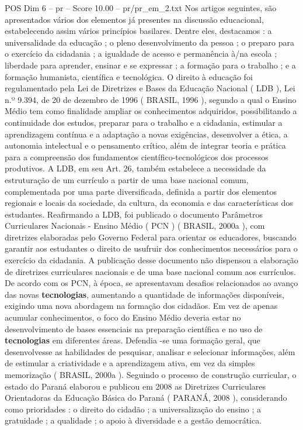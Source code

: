 \begin{textsample}{POS Dim 6 – pr – Score 10.00 – pr/pr\_em\_2.txt}
Nos artigos seguintes, são apresentados vários dos elementos já presentes na discussão educacional, estabelecendo assim vários princípios basilares.
Dentre eles, destacamos : a universalidade da educação ; o pleno desenvolvimento da pessoa ; o preparo para o exercício da cidadania ; a igualdade de acesso e permanência à/na escola ; liberdade para aprender, ensinar e se expressar ; a formação para o trabalho ; e a formação humanista, científica e tecnológica.
O direito à educação foi regulamentado pela Lei de Diretrizes e Bases da Educação Nacional ( LDB ), Lei n.º 9.394, de 20 de dezembro de 1996 ( BRASIL, 1996 ), segundo a qual o Ensino Médio tem como finalidade ampliar os conhecimentos adquiridos, possibilitando a continuidade dos estudos, preparar para o trabalho e a cidadania, estimular a aprendizagem contínua e a adaptação a novas exigências, desenvolver a ética, a autonomia intelectual e o pensamento crítico, além de integrar teoria e prática para a compreensão dos fundamentos científico-tecnológicos dos processos produtivos.
A LDB, em seu Art. 26, também estabelece a necessidade da estruturação de um currículo a partir de uma base nacional comum, complementada por uma parte diversificada, definida a partir dos elementos regionais e locais da sociedade, da cultura, da economia e das características dos estudantes.
Reafirmando a LDB, foi publicado o documento Parâmetros Curriculares Nacionais - Ensino Médio ( PCN ) ( BRASIL, 2000a ), com diretrizes elaboradas pelo Governo Federal para orientar os educadores, buscando garantir aos estudantes o direito de usufruir dos conhecimentos necessários para o exercício da cidadania.
A publicação desse documento não dispensou a elaboração de diretrizes curriculares nacionais e de uma base nacional comum aos currículos.
De acordo com os PCN, à época, se apresentavam desafios relacionados ao avanço das novas \textbf{tecnologias}, aumentando a quantidade de informações disponíveis, exigindo uma nova abordagem na formação dos cidadãos.
Em vez de apenas acumular conhecimentos, o foco do Ensino Médio deveria estar no desenvolvimento de bases essenciais na preparação científica e no uso de \textbf{tecnologias} em diferentes áreas.
Defendia -se uma formação geral, que desenvolvesse as habilidades de pesquisar, analisar e selecionar informações, além de estimular a criatividade e a aprendizagem ativa, em vez da simples memorização ( BRASIL, 2000a ).
Seguindo o processo de construção curricular, o estado do Paraná elaborou e publicou em 2008 as Diretrizes Curriculares Orientadoras da Educação Básica do Paraná ( PARANÁ, 2008 ), considerando como prioridades : o direito do cidadão ; a universalização do ensino ; a gratuidade ; a qualidade ; o apoio à diversidade e a gestão democrática.

\end{textsample}
